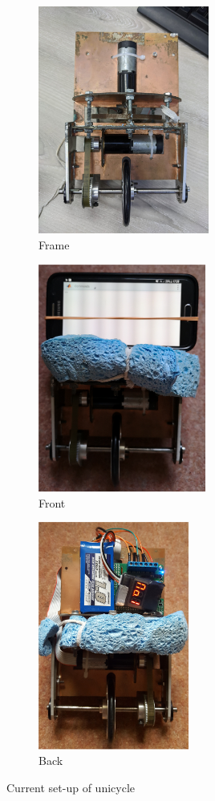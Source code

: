 \documentclass[twoside,twocolumn,12pt]{article}
\begin{document}
\clearpage
{}
\begin{figure}[hb!]
  \centering
  \begin{subfigure}[t]{0.325\textwidth}
    \includegraphics[width=\linewidth,height=7.5cm]{uni_old_mech}
   \caption{Frame}
  \label{sub:frameold}
  \end{subfigure}
  \begin{subfigure}[t]{0.325\textwidth}
    \includegraphics[width=\linewidth,height=7.5cm]{old1}
    \caption{Front \cite{arsalan}}
  \label{sub:frontold}
  \end{subfigure}
  \begin{subfigure}[t]{0.325\textwidth}
    \includegraphics[width=\linewidth,height=7.5cm]{old2}
    \caption{Back \cite{arsalan}}
  \label{sub:backold}
  \end{subfigure}
  \caption{Current set-up of unicycle}
  \label{fig:current}
\end{figure}
\end{document}
